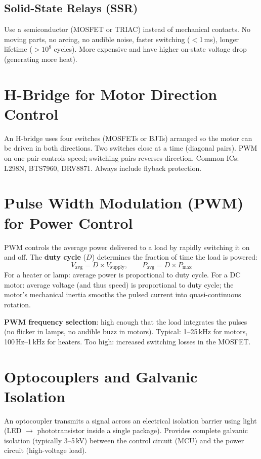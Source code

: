 \documentclass[11pt,letterpaper,twoside,openany]{book}
\begin{document}
\subsection{Solid-State Relays (SSR)}
Use a semiconductor (MOSFET or TRIAC) instead of mechanical contacts. No moving parts, no arcing, no audible noise, faster switching ($<$1\,ms), longer lifetime ($>10^8$ cycles). More expensive and have higher on-state voltage drop (generating more heat).

\section{H-Bridge for Motor Direction Control}
An H-bridge uses four switches (MOSFETs or BJTs) arranged so the motor can be driven in both directions. Two switches close at a time (diagonal pairs). PWM on one pair controls speed; switching pairs reverses direction. Common ICs: L298N, BTS7960, DRV8871. Always include flyback protection.


\section{Pulse Width Modulation (PWM) for Power Control}
PWM controls the average power delivered to a load by rapidly switching it on and off. The \textbf{duty cycle} ($D$) determines the fraction of time the load is powered:
\begin{equation}
V_{\text{avg}} = D \times V_{\text{supply}}, \qquad P_{\text{avg}} = D \times P_{\text{max}}
\end{equation}
For a heater or lamp: average power is proportional to duty cycle. For a DC motor: average voltage (and thus speed) is proportional to duty cycle; the motor's mechanical inertia smooths the pulsed current into quasi-continuous rotation.

\textbf{PWM frequency selection}: high enough that the load integrates the pulses (no flicker in lamps, no audible buzz in motors). Typical: 1--25\,kHz for motors, 100\,Hz--1\,kHz for heaters. Too high: increased switching losses in the MOSFET.

\section{Optocouplers and Galvanic Isolation}
An optocoupler transmits a signal across an electrical isolation barrier using light (LED $\to$ phototransistor inside a single package). Provides complete galvanic isolation (typically 3--5\,kV) between the control circuit (MCU) and the power circuit (high-voltage load).
\end{document}
